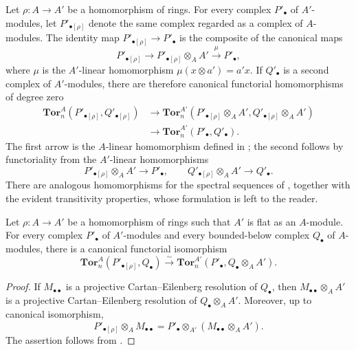\begin{env}[6.3.10]
\label{III.6.3.10}
Let $\rho:A\longrightarrow A'$ be a homomorphism of rings.  For
every complex $P'_\bullet$ of $A'$-modules, let
$P'_{\bullet[\rho]}$ denote the same complex regarded as a complex
of $A$-modules.  The identity map
$P'_{\bullet[\rho]}\longrightarrow P'_\bullet$ is the composite of
the canonical maps
\[
  P'_{\bullet[\rho]}
  \longrightarrow
  P'_{\bullet[\rho]}\otimes_AA'
  \xrightarrow{\ \mu\ }P'_\bullet,
\]
where $\mu$ is the $A'$-linear homomorphism
$\mu(x\otimes a')=a'x$.  If $Q'_\bullet$ is a second complex of
$A'$-modules, there are therefore canonical functorial
homomorphisms of degree zero
\[
  \begin{split}
  \mathbf{Tor}_n^A(P'_{\bullet[\rho]},Q'_{\bullet[\rho]})
  &\longrightarrow
  \mathbf{Tor}_n^{A'}
  (P'_{\bullet[\rho]}\otimes_AA',
   Q'_{\bullet[\rho]}\otimes_AA')\\
  &\longrightarrow
  \mathbf{Tor}_n^{A'}(P'_\bullet,Q'_\bullet).
  \end{split}
  \tag{6.3.10.1}\label{III.6.3.10.1}
\]
The first arrow is the $A$-linear homomorphism defined in
; the second follows by functoriality from the
$A'$-linear homomorphisms
\[
  P'_{\bullet[\rho]}\otimes_AA'\longrightarrow P'_\bullet,
  \qquad
  Q'_{\bullet[\rho]}\otimes_AA'\longrightarrow Q'_\bullet.
\]
There are analogous homomorphisms for the spectral sequences of
, together with the evident transitivity
properties, whose formulation is left to the reader.
\end{env}

\begin{proposition}[6.3.11]
\label{III.6.3.11}
Let $\rho:A\longrightarrow A'$ be a homomorphism of rings such that
$A'$ is flat as an $A$-module.  For every complex $P'_\bullet$ of
$A'$-modules and every bounded-below complex $Q_\bullet$ of
$A$-modules, there is a canonical functorial isomorphism
\[
  \mathbf{Tor}_n^A(P'_{\bullet[\rho]},Q_\bullet)
  \xrightarrow{\ \sim\ }
  \mathbf{Tor}_n^{A'}(P'_\bullet,Q_\bullet\otimes_AA').
  \tag{6.3.11.1}\label{III.6.3.11.1}
\]
\end{proposition}

\begin{proof}
If $M_{\bullet\bullet}$ is a projective Cartan--Eilenberg
resolution of $Q_\bullet$, then
$M_{\bullet\bullet}\otimes_AA'$ is a projective
Cartan--Eilenberg resolution of $Q_\bullet\otimes_AA'$.  Moreover,
up to canonical isomorphism,
\[
  P'_{\bullet[\rho]}\otimes_AM_{\bullet\bullet}
  =
  P'_\bullet\otimes_{A'}
  (M_{\bullet\bullet}\otimes_AA').
\]
The assertion follows from .
\end{proof}

